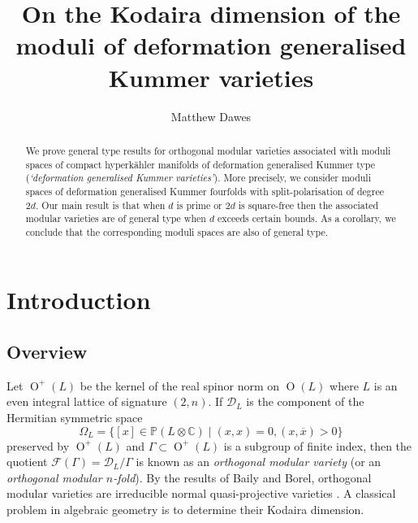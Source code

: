 \documentclass[12pt, a4paper]{article}
\title{On the Kodaira dimension of the moduli of deformation generalised Kummer varieties}
\author{Matthew Dawes}
\date{}
\newcommand{\CC}{\mathbb{C}}
\newcommand{\PP}{\mathbb{P}}
\newcommand{\dc}{\mathcal{D}}
\newcommand{\fc}{\mathcal{F}}
\newcommand{\opn}{\operatorname}
\begin{document}
\maketitle
\begin{abstract}
  We prove general type results for orthogonal modular varieties associated with moduli spaces of compact hyperk\"ahler manifolds of deformation generalised Kummer type (\emph{`deformation generalised Kummer varieties'}).
  More precisely, we consider moduli spaces of deformation generalised Kummer fourfolds with split-polarisation of degree $2d$.
  Our main result is that when $d$ is prime or $2d$ is square-free then the associated modular varieties are of general type when $d$ exceeds certain bounds.
  As a corollary, we conclude that the corresponding moduli spaces are also of general type.
\end{abstract}
\section{Introduction}\label{introsec}
\subsection{Overview}
Let $\opn{O}^+(L)$ be the kernel of the real spinor norm on $\opn{O}(L)$ where $L$ is an even integral lattice of signature $(2,n)$.
If $\dc_L$ is the component of the Hermitian symmetric space 
\begin{equation*}\Omega_L = \{ [x] \in \PP(L \otimes \CC) \mid (x,x)=0, (x, \overline{x})>0 \}
\end{equation*}
preserved by $\opn{O}^+(L)$ and $\Gamma \subset \opn{O}^+(L)$ is a subgroup of finite index, then the quotient 
$\fc(\Gamma) = \dc_L/\Gamma$ is known as an \emph{orthogonal modular variety} (or an \emph{orthogonal modular $n$-fold}).  
By the results of Baily and Borel, orthogonal modular varieties are irreducible normal quasi-projective varieties \cite{bailyborel}.
A classical problem in algebraic geometry is to determine their Kodaira dimension.
\end{document}
